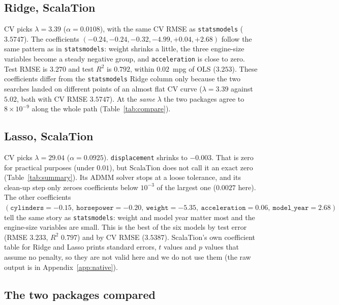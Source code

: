 \documentclass[11pt]{article}
\begin{document}
\begin{table}[htbp]
\centering\small

\caption{\texttt{statsmodels}: plain OLS refit on the predictors Lasso kept (scaled predictors). The $p$-values ignore the selection step.}\label{tab:refit}
\end{table}

\subsection{Ridge, ScalaTion}\label{sec:ridge-st}
CV picks $\lambda=3.39$ ($\alpha=0.0108$), with the same CV RMSE as \texttt{statsmodels} ($3.5747$). The coefficients
$(-0.24,-0.24,-0.32,-4.99,+0.04,+2.68)$ follow the same pattern as in \texttt{statsmodels}: weight shrinks a little, the three
engine-size variables become a steady negative group, and \texttt{acceleration} is close to zero. Test RMSE is $3.270$ and test
$R^2$ is $0.792$, within $0.02$~mpg of OLS ($3.253$). These coefficients differ from the \texttt{statsmodels} Ridge column only
because the two searches landed on different points of an almost flat CV curve ($\lambda=3.39$ against $5.02$, both with CV RMSE $3.5747$).
At the \emph{same} $\lambda$ the two packages agree to $8\times10^{-9}$ along the whole path (Table~\ref{tab:compare}).

\subsection{Lasso, ScalaTion}\label{sec:lasso-st}
CV picks $\lambda=29.04$ ($\alpha=0.0925$). \texttt{displacement} shrinks to $-0.003$. That is zero for practical purposes (under
$0.01$), but ScalaTion does not call it an exact zero (Table~\ref{tab:summary}). Its ADMM solver stops at a loose tolerance, and
its clean-up step only zeroes coefficients below $10^{-3}$ of the largest one ($0.0027$ here). The other coefficients
$(\texttt{cylinders}=-0.15,\ \texttt{horsepower}=-0.20,\ \texttt{weight}=-5.35,\ \texttt{acceleration}=0.06,\
\texttt{model\_year}=2.68)$ tell the same story as \texttt{statsmodels}: weight and model year matter most and the engine-size
variables are small. This is the best of the six models by test error (RMSE $3.233$, $R^2$ $0.797$) and by CV RMSE ($3.5387$).
ScalaTion's own coefficient table for Ridge and Lasso prints standard errors, $t$ values and $p$ values that assume no
penalty, so they are not valid here and we do not use them (the raw output is in Appendix~\ref{app:native}).

\subsection{The two packages compared}
\end{document}
